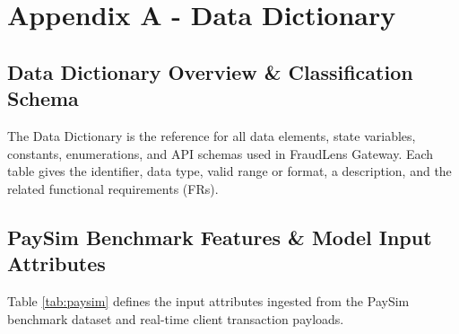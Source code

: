 \documentclass[12pt, a4paper]{report}
\begin{document}
\newpage

\chapter{Appendix A - Data Dictionary}

\section{Data Dictionary Overview \& Classification Schema}
The Data Dictionary is the reference for all data elements, state variables, constants, enumerations, and API schemas used in FraudLens Gateway. Each table gives the identifier, data type, valid range or format, a description, and the related functional requirements (FRs).

\section{PaySim Benchmark Features \& Model Input Attributes}
Table \ref{tab:paysim} defines the input attributes ingested from the PaySim benchmark dataset and real-time client transaction payloads.
\end{document}
